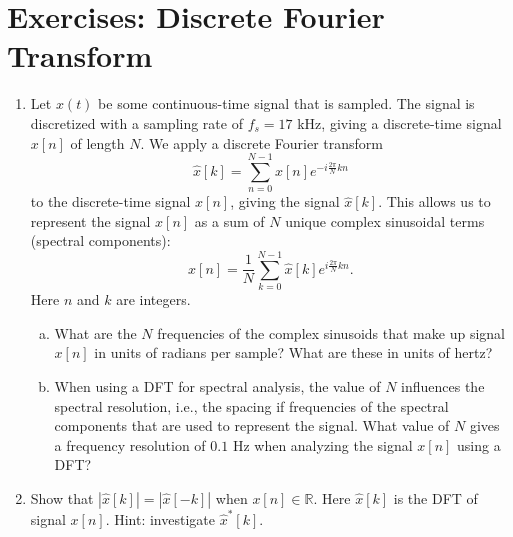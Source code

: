 \newpage
\section{Exercises: Discrete Fourier Transform}

\begin{enumerate}
  \item Let $x(t)$ be some continuous-time signal that is sampled. The signal is discretized with a sampling rate of $f_{s}=17$ kHz, giving a discrete-time signal $x[n]$ of length $N$. We apply a discrete Fourier transform
        \begin{equation}
          \hat{x}[k] = \sum_{n=0}^{N-1} x[n] e^{-i\frac{2\pi}{N}kn}
        \end{equation}
        to the discrete-time signal $x[n]$, giving the signal
        $\hat{x}[k]$. This allows us to represent the signal $x[n]$ as a sum of $N$
        unique complex sinusoidal terms (spectral components):
        \begin{equation}
          x[n] = \frac{1}{N}\sum_{k=0}^{N-1} \hat{x}[k] e^{i\frac{2\pi}{N}kn}.
        \end{equation}
        Here $n$ and $k$ are integers.

        \begin{enumerate}[a)]
          \item What are the $N$ frequencies of the complex sinusoids that make up signal $x[n]$ in units of radians per sample? What are these in units of hertz?

          \item When using a DFT for spectral analysis, the value of $N$ influences the spectral resolution, i.e., the spacing if frequencies of the spectral components that are used to represent the signal. What value of $N$ gives a frequency resolution of $0.1$ Hz when analyzing the signal $x[n]$ using a DFT?
        \end{enumerate}

  \item Show that $|\hat{x}[k]|=|\hat{x}[-k]|$ when $x[n] \in \mathbb{R}$. Here $\hat{x}[k]$ is the DFT of signal $x[n]$. Hint: investigate $\hat{x}^*[k]$.


\end{enumerate}
